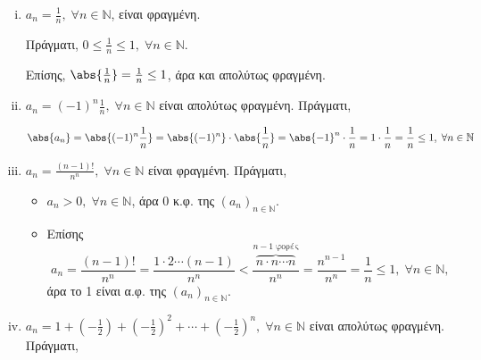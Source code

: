 \documentclass[main.tex]{subfiles}
\begin{document}
\begin{examples}
\item {}  
    \begin{enumerate}[i)]
        \item $ a_{n}= \frac{1}{n}, \; \forall n \in \mathbb{N} $, είναι 
            φραγμένη.

            Πράγματι, $ 0 \leq \frac{1}{n} \leq 1, \; \forall n \in 
            \mathbb{N} $. 

            Επίσης, $ \abs{\frac{1}{n}} = \frac{1}{n} \leq 1 $, άρα και 
            απολύτως φραγμένη.
        \item $ a_{n}=(-1)^{n} \frac{1}{n}, \; \forall n \in \mathbb{N} $ 
            είναι απολύτως φραγμένη. Πράγματι,

            \[
                \abs{a_{n}} = \abs{(-1)^{n} \frac{1}{n}} = \abs{(-1)^{n}} 
                \cdot \abs{\frac{1}{n}} = \abs{-1}^{n} \cdot \frac{1}{n}
                = 1 \cdot \frac{1}{n} = \frac{1}{n} \leq 1, \; \forall n 
                \in \mathbb{N}
            \] 

        \item $ a_{n}= \frac{(n-1)!}{n^{n}}, \; \forall n \in \mathbb{N} $
            είναι φραγμένη. Πράγματι, 

            \begin{itemize}
                \item $ a_{n} > 0, \; \forall n \in 
                    \mathbb{N}$, άρα 0 κ.φ. της $( a_{n})_{n \in 
                    \mathbb{N}} $. 
                \item Επίσης 
                    \[
                        a_{n}= \frac{(n-1)!}{n^{n}} = \frac{1 \cdot 2 
                            \cdots (n-1)}{n^{n}} < \frac{\overbrace{n 
                                \cdot n \cdots n} ^{n-1 \; 
                        \text{φορές}}}{n^{n}} = \frac{n^{n-1}}{n^{n}} =
                        \frac{1}{n} \leq 1, \; \forall n \in \mathbb{N},
                    \]
                    άρα το 1 είναι α.φ. της $(a_{n})_{n \in \mathbb{N}}$. 
            \end{itemize}

        \item $ a_{n}= 1 + \left(- \frac{1}{2} \right) + \left(- 
                \frac{1}{2}\right)^{2} + \cdots + \left(-\frac{1}{2} 
            \right) ^{n}, 
            \; \forall n \in \mathbb{N} $ είναι απολύτως φραγμένη. Πράγματι,


\end{enumerate}
\end{examples}
\end{document}
